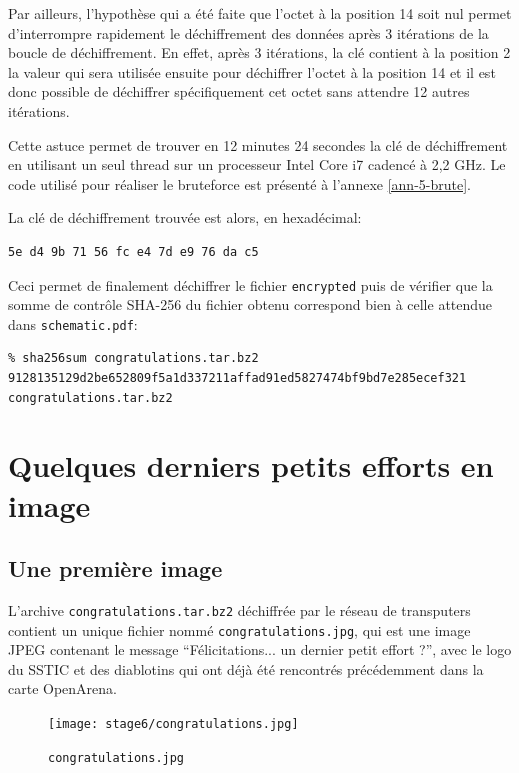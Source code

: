 \documentclass[a4paper,10pt]{article}
\begin{document}
Par ailleurs, l'hypothèse qui a été faite que l'octet à la position 14 soit nul permet d'interrompre rapidement le déchiffrement des données après 3 itérations de la boucle de déchiffrement.
En effet, après 3 itérations, la clé contient à la position 2 la valeur qui sera utilisée ensuite pour déchiffrer l'octet à la position 14 et il est donc possible de déchiffrer spécifiquement cet octet sans attendre 12 autres itérations.

Cette astuce permet de trouver en 12 minutes 24 secondes la clé de déchiffrement en utilisant un seul thread sur un processeur Intel Core i7 cadencé à 2,2 GHz.
Le code utilisé pour réaliser le bruteforce est présenté à l'annexe \ref{ann-5-brute}.

La clé de déchiffrement trouvée est alors, en hexadécimal:
\begin{verbatim}
5e d4 9b 71 56 fc e4 7d e9 76 da c5
\end{verbatim}

Ceci permet de finalement déchiffrer le fichier \texttt{encrypted} puis de vérifier que la somme de contrôle SHA-256 du fichier obtenu correspond bien à celle attendue dans \texttt{schematic.pdf}:
\begin{verbatim}
% sha256sum congratulations.tar.bz2
9128135129d2be652809f5a1d337211affad91ed5827474bf9bd7e285ecef321  congratulations.tar.bz2
\end{verbatim}

\clearpage
\section{Quelques derniers petits efforts en image}

\subsection{Une première image}

L'archive \texttt{congratulations.tar.bz2} déchiffrée par le réseau de transputers contient un unique fichier nommé \texttt{congratulations.jpg}, qui est une image JPEG contenant le message ``Félicitations... un dernier petit effort ?'', avec le logo du SSTIC et des diablotins qui ont déjà été rencontrés précédemment dans la carte OpenArena.

\begin{figure}[ht]
  \centering
  \texttt{[image: stage6/congratulations.jpg]}
  \caption{\texttt{congratulations.jpg}}
  \label{fig6-jpg}
\end{figure}
\end{document}
